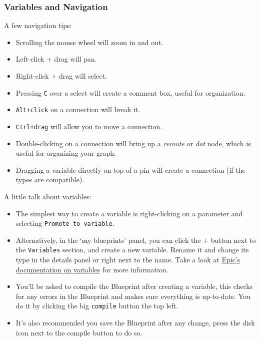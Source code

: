 \documentclass{article}
\begin{document}
\subsubsection{Variables and Navigation}

A few navigation tips:
\begin{itemize}
    \item Scrolling the mouse wheel will zoom in and out.
    \item Left-click $+$ drag will pan.
    \item Right-click $+$ drag will select.
    \item Pressing \verb|C| over a select will create a comment box, useful for organization.
    \item \verb|Alt+click| on a connection will break it.
    \item \verb|Ctrl+drag| will allow you to move a connection.
    \item Double-clicking on a connection will bring up a \emph{reroute} or \emph{dot} node, which is useful for organizing your graph.
    \item Dragging a variable directly on top of a pin will create a connection (if the types are compatible).
\end{itemize}

A little talk about variables:

\begin{itemize}
    \item The simplest way to create a variable is right-clicking on a parameter and selecting \verb|Promote to variable|.
    \item Alternatively, in the `my blueprints' panel, you can click the $+$ button next to the \verb|Variables| section, and create a new variable. Rename it and change its type in the details panel or right next to the name. Take a look at \href{https://dev.epicgames.com/documentation/en-us/unreal-engine/blueprint-variables-in-unreal-engine}{Epic's documentation on variables} for more information.
    \item You'll be asked to compile the Blueprint after creating a variable, this checks for any errors in the Blueprint and makes sure everything is up-to-date. You do it by clicking the big \verb|compile| button the top left.
    \item It's also recommended you save the Blueprint after any change, press the disk icon next to the compile button to do so.
\end{itemize}
\end{document}

